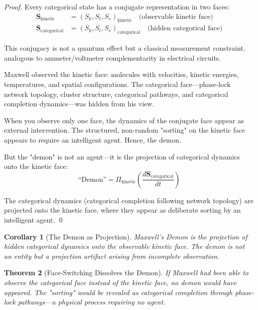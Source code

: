 \documentclass[12pt,a4paper]{article}
\newtheorem{theorem}{Theorem}[section]
\newtheorem{corollary}[theorem]{Corollary}
\theoremstyle{definition}
\theoremstyle{remark}
\begin{document}
\begin{proof}
Every categorical state has a conjugate representation in two faces:
\begin{align}
\mathbf{S}_{\text{kinetic}} &= (S_{k}, S_{t}, S_{e})_{\text{kinetic}} \quad \text{(observable kinetic face)} \\
\mathbf{S}_{\text{categorical}} &= (S_{k}, S_{t}, S_{e})_{\text{categorical}} \quad \text{(hidden categorical face)}
\end{align}

This conjugacy is not a quantum effect but a classical measurement constraint, analogous to ammeter/voltmeter complementarity in electrical circuits.

Maxwell observed the kinetic face: molecules with velocities, kinetic energies, temperatures, and spatial configurations. The categorical face—phase-lock network topology, cluster structure, categorical pathways, and categorical completion dynamics—was hidden from his view.

When you observe only one face, the dynamics of the conjugate face appear as external intervention. The structured, non-random "sorting" on the kinetic face appears to require an intelligent agent. Hence, the demon.

But the "demon" is not an agent—it is the projection of categorical dynamics onto the kinetic face:
\begin{equation}
\text{``Demon''} = \Pi_{\text{kinetic}}\left(\frac{d\mathbf{S}_{\text{categorical}}}{dt}\right)
\end{equation}

The categorical dynamics (categorical completion following network topology) are projected onto the kinetic face, where they appear as deliberate sorting by an intelligent agent. \qed
\end{proof}

\begin{corollary}[The Demon as Projection]
\label{cor:demon_projection}
Maxwell's Demon is the projection of hidden categorical dynamics onto the observable kinetic face. The demon is not an entity but a projection artifact arising from incomplete observation.
\end{corollary}

\begin{theorem}[Face-Switching Dissolves the Demon]
\label{thm:face_switching}
If Maxwell had been able to observe the categorical face instead of the kinetic face, no demon would have appeared. The "sorting" would be revealed as categorical completion through phase-lock pathways—a physical process requiring no agent.
\end{theorem}
\end{document}
